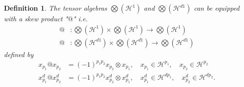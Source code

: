 \documentclass[aps,preprint]{revtex4}%
\newtheorem{definition}[theorem]{Definition}
\begin{document}
\begin{definition}
The tensor algebras $%
{\textstyle\bigotimes}
\left(  \mathcal{H}^{1}\right)  $ and $%
{\textstyle\bigotimes}
\left(  \mathcal{H}^{d1}\right)  $ can be equipped with a \emph{skew product}
"$@$" i.e.
\begin{align}
@  &  :%
{\textstyle\bigotimes}
\left(  \mathcal{H}^{1}\right)  \times%
{\textstyle\bigotimes}
\left(  \mathcal{H}^{1}\right)  \rightarrow%
{\textstyle\bigotimes}
\left(  \mathcal{H}^{1}\right) \\
@  &  :%
{\textstyle\bigotimes}
\left(  \mathcal{H}^{d1}\right)  \times%
{\textstyle\bigotimes}
\left(  \mathcal{H}^{d1}\right)  \rightarrow%
{\textstyle\bigotimes}
\left(  \mathcal{H}^{d1}\right)
\end{align}
defined by
\begin{align}
x_{p_{1}}@x_{p_{2}}  &  =\left(  -1\right)  ^{p_{1}p_{2}}x_{p_{2}}\otimes
x_{p_{1}},\quad x_{p_{1}}\in\mathcal{H}^{p_{1}},\quad x_{p_{2}}\in
\mathcal{H}^{p_{2}}\\
x_{p_{1}}^{d}@x_{p_{2}}^{d}  &  =\left(  -1\right)  ^{p_{1}p_{2}}x_{p_{2}}%
^{d}\otimes x_{p_{1}}^{d},\quad x_{p_{1}}^{d}\in\mathcal{H}^{dp_{1}},\quad
x_{p_{2}}^{d}\in\mathcal{H}^{dp_{2}}.
\end{align}

\end{definition}
\end{document}
